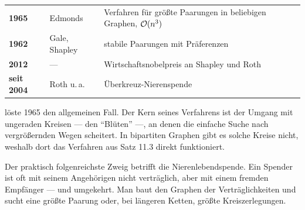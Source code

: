 \begin{forschung}
\begin{center}
{\small
\renewcommand{\arraystretch}{1.45}
\begin{tabular}{@{}P{1.4cm}P{2.6cm}P{3.8cm}@{}}
\toprule
\textbf{1965} & Edmonds & Verfahren für größte Paarungen in beliebigen Graphen, $\mathcal{O}(n^3)$\\
\textbf{1962} & Gale, Shapley & stabile Paarungen mit Präferenzen\\
\textbf{2012} & --- & Wirtschaftsnobelpreis an Shapley und Roth\\
\textbf{seit 2004} & Roth u.\,a. & Überkreuz-Nierenspende\\
\bottomrule
\end{tabular}}
\end{center}

 löste 1965 den allgemeinen Fall. Der Kern seines Verfahrens ist der Umgang mit ungeraden Kreisen --- den \enquote{Blüten} ---, an denen die einfache Suche nach vergrößernden Wegen scheitert. In bipartiten Graphen gibt es solche Kreise nicht, weshalb dort das Verfahren aus Satz 11.3 direkt funktioniert.

Der praktisch folgenreichste Zweig betrifft die Nierenlebendspende. Ein Spender ist oft mit seinem Angehörigen nicht verträglich, aber mit einem fremden Empfänger --- und umgekehrt. Man baut den Graphen der Verträglichkeiten und sucht eine größte Paarung oder, bei längeren Ketten, größte Kreiszerlegungen.

\begin{center}
\begin{minipage}{0.88\textwidth}
\end{minipage}
\end{center}
\end{forschung}

